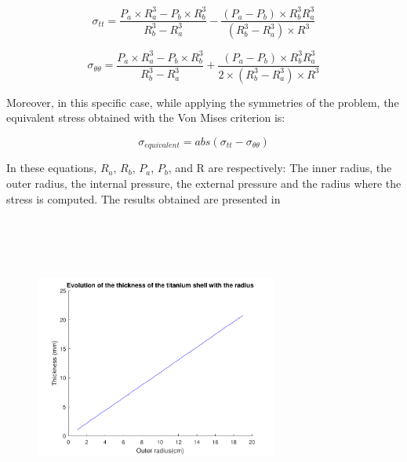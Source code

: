 \begin{equation}
\sigma_{tt}=\frac{P_{a}\times R_{a}^{3}-P_{b}\times R_{b}^{3}}{R_{b}^{3}-R_{a}^{3}}-\frac{(P_{a}-P_{b}) \times R_{b}^{3} R_{a}^{3}}{(R_{b}^{3}-R_{a}^{3}) \times R^{3}}
\end{equation}

\begin{equation}
\sigma_{\theta\theta}=\frac{P_{a}\times R_{a}^{3}-P_{b}\times R_{b}^{3}}{R_{b}^{3}-R_{a}^{3}}+\frac{(P_{a}-P_{b}) \times R_{b}^{3} R_{a}^{3}}{2 \times (R_{b}^{3}-R_{a}^{3}) \times R^{3}}
\end{equation}

Moreover, in this specific case, while applying the symmetries of the problem, the equivalent stress obtained with the Von Mises criterion is:

\begin{equation}
\sigma_{equivalent}= abs(\sigma_{tt}-\sigma_{\theta\theta})
\end{equation}

In these equations, $R_{a}$, $R_{b}$, $P_{a}$, $P_{b}$, and R are respectively: The inner radius, the outer radius, the internal pressure, the external pressure and the radius where the stress is computed. The results obtained are presented in


\begin{figure}[htb]
\centering
\includegraphics[width=8cm, height=10cm, clip]{figures/Paul/Thickness.pdf}
\caption{}
\label{}
\end{figure}

